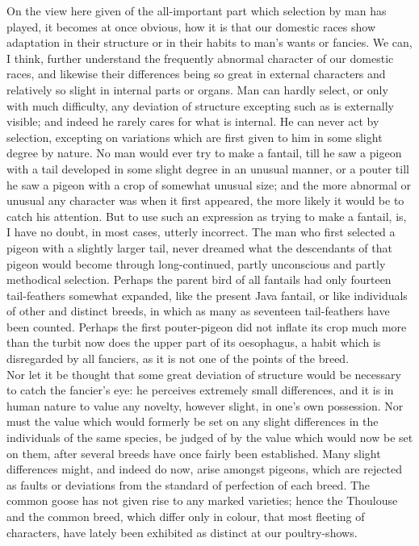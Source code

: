 \indent On the view here given of the all-important part which selection by man has played, it becomes at once obvious, how it is that our domestic races show adaptation in their structure or in their habits to man's wants or fancies. We can, I think, further understand the frequently abnormal character of our domestic races, and likewise their differences being so great in external characters and relatively so slight in internal parts or organs. Man can hardly select, or only with much difficulty, any deviation of structure excepting such as is externally visible; and indeed he rarely cares for what is internal. He can never act by selection, excepting on variations which are first given to him in some slight degree by nature. No man would ever try to make a fantail, till he saw a pigeon with a tail developed in some slight degree in an unusual manner, or a pouter till he saw a pigeon with a crop of somewhat unusual size; and the more abnormal or unusual any character was when it first appeared, the more likely it would be to catch his attention. But to use such an expression as trying to make a fantail, is, I have no doubt, in most cases, utterly incorrect. The man who first selected a pigeon with a slightly larger tail, never dreamed what the descendants of that pigeon would become through long-continued, partly unconscious and partly methodical selection. Perhaps the parent bird of all fantails had only fourteen tail-feathers somewhat expanded, like the present Java fantail, or like individuals of other and distinct breeds, in which as many as seventeen tail-feathers have been counted. Perhaps the first pouter-pigeon did not inflate its crop much more than the turbit now does the upper part of its oesophagus, a habit which is disregarded by all fanciers, as it is not one of the points of the breed.  \\
\indent Nor let it be thought that some great deviation of structure would be necessary to catch the fancier's eye: he perceives extremely small differences, and it is in human nature to value any novelty, however slight, in one's own possession. Nor must the value which would formerly be set on any slight differences in the individuals of the same species, be judged of by the value which would now be set on them, after several breeds have once fairly been established. Many slight differences might, and indeed do now, arise amongst pigeons, which are rejected as faults or deviations from the standard of perfection of each breed.  The common goose has not given rise to any marked varieties; hence the Thoulouse and the common breed, which differ only in colour, that most fleeting of characters, have lately been exhibited as distinct at our poultry-shows.  \\
